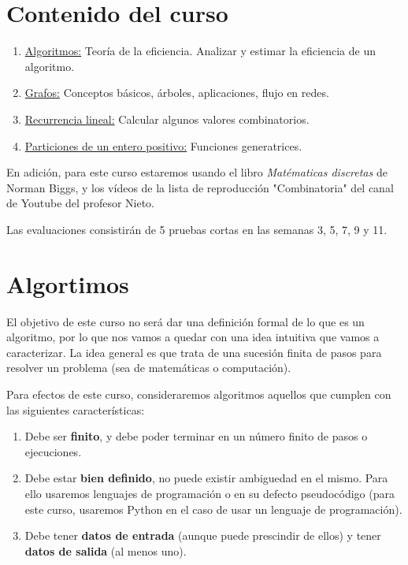 \section{Contenido del curso}

\begin{enumerate}
    \item \ul{Algoritmos:} Teoría de la eficiencia. Analizar y estimar la eficiencia de un algoritmo.
    \item \ul{Grafos:} Conceptos básicos, árboles, aplicaciones, flujo en redes.
    \item \ul{Recurrencia lineal:} Calcular algunos valores combinatorios.
    \item \ul{Particiones de un entero positivo:} Funciones generatrices.
\end{enumerate}

En adición, para este curso estaremos usando el libro \textit{Matématicas discretas} de Norman Biggs, y los vídeos de la lista de reproducción "Combinatoria" del canal de Youtube del profesor Nieto.

Las evaluaciones consistirán de 5 pruebas cortas en las semanas 3, 5, 7, 9 y 11.

\section{Algortimos}

El objetivo de este curso no será dar una definición formal de lo que es un algoritmo, por lo que nos vamos a quedar con una idea intuitiva que vamos a caracterizar. La idea general es que trata de una sucesión finita de pasos para resolver un problema (sea de matemáticas o computación).

Para efectos de este curso, consideraremos algoritmos aquellos que cumplen con las siguientes características:

\begin{enumerate}
    \item Debe ser \textbf{finito}, y debe poder terminar en un número finito de pasos o ejecuciones.
    \item Debe estar \textbf{bien definido}, no puede existir ambiguedad en el mismo. Para ello usaremos lenguajes de programación o en su defecto pseudocódigo (para este curso, usaremos Python en el caso de usar un lenguaje de programación).
    \item Debe tener \textbf{datos de entrada} (aunque puede prescindir de ellos) y tener \textbf{datos de salida} (al menos uno).
\end{enumerate}

